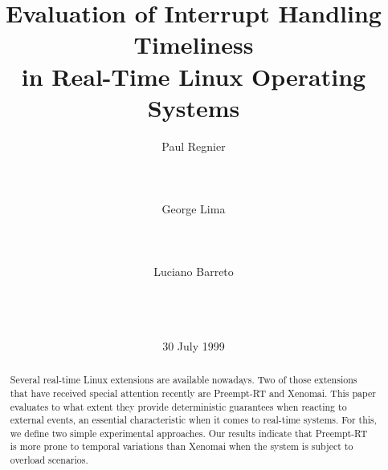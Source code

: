 \documentclass{acm_proc_article-sp}
\begin{document}


     
 
\title{Evaluation of Interrupt Handling Timeliness\\in Real-Time Linux Operating Systems}

\author{
\alignauthor
Paul Regnier\\%
       \\
       \\
       \\
%
\alignauthor
George Lima \\%
       \\
       \\
       \\
%
\alignauthor
Luciano Barreto \\%
       \\
       \\
       \\
}

\date{30 July 1999}


\maketitle

\begin{abstract}
  Several real-time Linux extensions are available nowadays. Two of those extensions
  that have received special attention recently are Preempt-RT and Xenomai. This
  paper evaluates to what extent they provide deterministic guarantees when reacting
  to external events, an essential characteristic when it comes to real-time
  systems. For this, we define two simple experimental approaches.  Our results
  indicate that Preempt-RT is more prone to temporal variations than Xenomai when
  the system is subject to overload scenarios.
\end{abstract}
      
\end{document}
